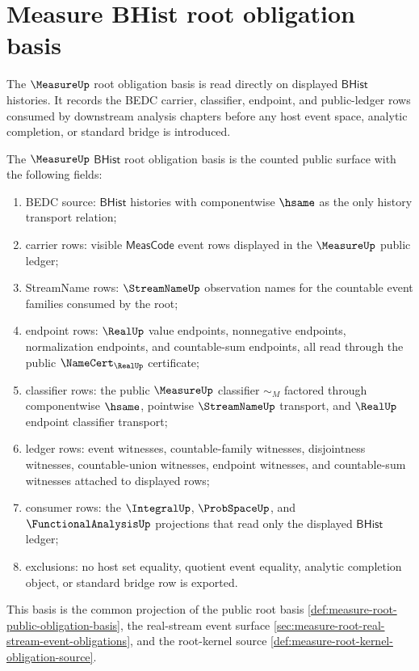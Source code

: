 \section{Measure BHist root obligation basis}
\label{sec:measure-bhist-root-obligation-basis}

The $\MeasureUp$ root obligation basis is read directly on displayed
$\mathsf{BHist}$ histories. It records the BEDC carrier, classifier, endpoint,
and public-ledger rows consumed by downstream analysis chapters before any
host event space, analytic completion, or standard bridge is introduced.

\begin{definition}
\label{def:measure-bhist-root-obligation-basis}
The $\MeasureUp$ $\mathsf{BHist}$ root obligation basis is the counted public
surface with the following fields:
\begin{enumerate}
  \item BEDC source: $\mathsf{BHist}$ histories with componentwise $\hsame$
  as the only history transport relation;
  \item carrier rows: visible $\mathsf{MeasCode}$ event rows displayed in the
  $\MeasureUp$ public ledger;
  \item StreamName rows: $\StreamNameUp$ observation names for the countable
  event families consumed by the root;
  \item endpoint rows: $\RealUp$ value endpoints, nonnegative endpoints,
  normalization endpoints, and countable-sum endpoints, all read through the
  public $\NameCert_{\RealUp}$ certificate;
  \item classifier rows: the public $\MeasureUp$ classifier $\sim_M$ factored
  through componentwise $\hsame$, pointwise $\StreamNameUp$ transport, and
  $\RealUp$ endpoint classifier transport;
  \item ledger rows: event witnesses, countable-family witnesses,
  disjointness witnesses, countable-union witnesses, endpoint witnesses, and
  countable-sum witnesses attached to displayed rows;
  \item consumer rows: the $\IntegralUp$, $\ProbSpaceUp$, and
  $\FunctionalAnalysisUp$ projections that read only the displayed
  $\mathsf{BHist}$ ledger;
  \item exclusions: no host set equality, quotient event equality, analytic
  completion object, or standard bridge row is exported.
\end{enumerate}
This basis is the common projection of the public root basis
\autoref{def:measure-root-public-obligation-basis}, the real-stream event
surface \autoref{sec:measure-root-real-stream-event-obligations}, and the
root-kernel source \autoref{def:measure-root-kernel-obligation-source}.
\end{definition}

